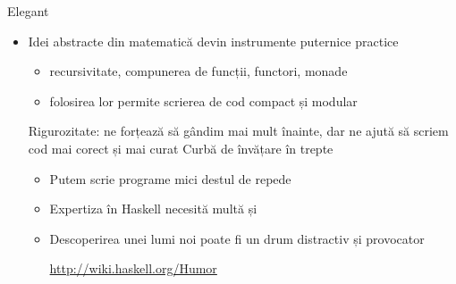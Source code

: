 \documentclass[xcolor=pdftex,romanian,colorlinks]{beamer}
\begin{document}
\begin{frame}{Elegant}
\begin{itemize}
\item Idei abstracte din matematică devin instrumente puternice practice 
\begin{itemize}
\item recursivitate, compunerea de funcții, functori, monade 
\item folosirea lor permite scrierea de cod compact și modular
\end{itemize}
\vitem Rigurozitate:  ne forțează să gândim mai mult înainte, dar ne ajută să scriem cod mai corect și mai curat
\vitem Curbă de învățare în trepte
\begin{itemize}
\item Putem scrie programe mici destul de repede
\item Expertiza în Haskell necesită multă  și 
\item Descoperirea unei lumi noi poate fi un drum distractiv și provocator

\url{http://wiki.haskell.org/Humor}
\end{itemize}
\end{itemize}
\end{frame}
\end{document}
